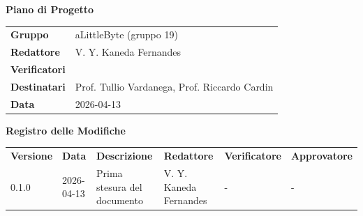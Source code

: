 \documentclass[a4paper,12pt]{article}
\begin{document}
\thispagestyle{firstpage}

\vspace*{0.5cm}

\begin{center}
    {\LARGE \textbf{Piano di Progetto}}
\end{center}

\vspace{1.5cm}

\begin{center}
    \renewcommand{\arraystretch}{1.3}
    \begin{tcolorbox}[
        width=0.92\textwidth,
        colback=gray!6,
        colframe=gray!45,
        boxrule=0.5pt,
        arc=2mm,
        boxsep=0pt,
        left=8pt, right=8pt, top=8pt, bottom=8pt
    ]
        \begin{tabularx}{\linewidth}{>{\bfseries}p{3.5cm} X}
            Gruppo      & aLittleByte (gruppo 19) \\
            Redattore   & V. Y. Kaneda Fernandes \\
            Verificatori &  \\
            Destinatari & Prof. Tullio Vardanega, Prof. Riccardo Cardin \\
            Data        & 2026-04-13
        \end{tabularx}
    \end{tcolorbox}
\end{center}

\newpage
{}

\begin{center}
    {\Large \textbf{Registro delle Modifiche}}
\end{center}

\vspace{0.35cm}

\renewcommand{\arraystretch}{1.35}
\begin{center}
    {\footnotesize
    \begin{tabularx}{\textwidth}{|l|l|X|p{2cm}|p{2cm}|p{2cm}|}
        \hline
        \rowcolor{gray!20}
        \textbf{Versione} & \textbf{Data} & \textbf{Descrizione} & \textbf{Redattore} & \textbf{Verificatore} & \textbf{Approvatore} \\
        0.1.0 & 2026-04-13 & Prima stesura del documento & V. Y. Kaneda Fernandes & - & - \\
        \hline 
    \end{tabularx}
    }
\end{center}
\end{document}
